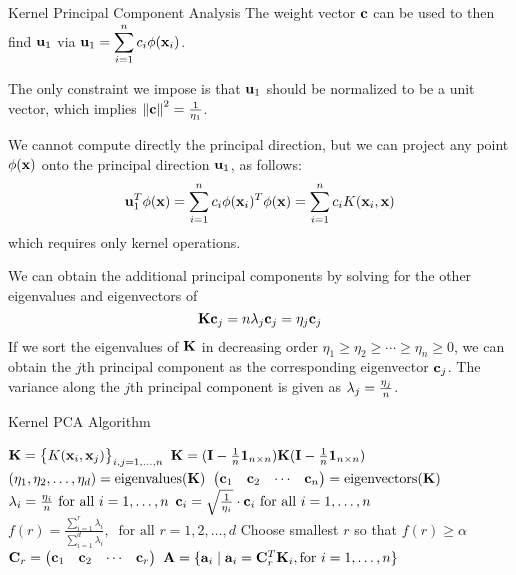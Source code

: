 \begin{frame}{Kernel Principal Component Analysis}
  \small
  The weight vector $\mathbf{c}$ can be used to then find $\mathbf{u}_1$ via
$\mathbf{u}_1 = \displaystyle \sum_{i=1}^n c_{i} \phi(\mathbf{x}_i)$.

\medskip
The only constraint we impose is that $\mathbf{u}_1$
should be
normalized to be a unit vector, which implies
  $\left\lVert\mathbf{c}\right\rVert^2 = {1 \over \eta_1}$.


\medskip
We cannot compute directly the
principal direction, but we can
project any point $\phi(\mathbf{x})$ onto the principal
direction $\mathbf{u}_1$, as follows:
\begin{align*}
  \mathbf{u}_1^T\phi(\mathbf{x}) = \displaystyle \sum_{i=1}^n c_i\phi(\mathbf{x}_i)^T\phi(\mathbf{x}) =
  \displaystyle \sum_{i=1}^n c_i K(\mathbf{x}_i,\mathbf{x})
\end{align*}
which requires only kernel operations. 

\medskip
We can obtain the additional principal
components by solving for the other eigenvalues and eigenvectors of
$$\mathbf{K}\mathbf{c}_j = n \lambda_j \mathbf{c}_j = \eta_j \mathbf{c}_j$$
If we sort the
eigenvalues of $\mathbf{K}$ in decreasing order
$\eta_1 \ge \eta_2 \ge \cdots
\ge \eta_n \ge 0$, we can obtain the $j$th principal component as
the corresponding eigenvector $\mathbf{c}_{j}$.
The variance
along the $j$th principal component is given as 
$\lambda_{j} = {\eta_{j} \over n}$. 
\end{frame}


\begin{frame}{Kernel PCA Algorithm}
  \begin{algorithm}[H]
\newcommand{\KPCA}{\textsc{KernelPCA}}
\SetKwInOut{Algorithm}{\KPCA\ ($\bD, K, \alpha$)}
\Algorithm{}
$\mathbf{K} = \bigl\{K(\mathbf{x}_i, \mathbf{x}_{j}) \bigr\}_{i,j=1,\ldots,n}$ 
$\mathbf{K}  = (\mathbf{I} - {1\over n}\mathbf{1}_{n\times n}) \mathbf{K} (\mathbf{I} - {1\over
n}\mathbf{1}_{n \times n})$ 
$(\eta_1, \eta_2, \ldots, \eta_d) =
\text{eigenvalues}(\mathbf{K})$ 
$\begin{pmatrix} \mathbf{c}_1 & \mathbf{c}_2 & \cdots & \mathbf{c}_n \end{pmatrix} =
\text{eigenvectors}(\mathbf{K})$ 
$\lambda_i = {\eta_i \over n} \text{ for all } i = 1, \ldots,
n$ 
$\mathbf{c}_i = \sqrt{1 \over \eta_i} \cdot \mathbf{c}_i \text{ for all } i =
1, \ldots, n$ 
$f(r) = \frac{\sum_{i=1}^r \lambda_i}{\sum_{i=1}^d \lambda_i},
\;\; \text{for all } r=1, 2, \ldots, d$ 
Choose smallest $r$ so that $f(r) \ge \alpha$ 
$\mathbf{C}_r = \begin{pmatrix} \mathbf{c}_1 & \mathbf{c}_2 & \cdots & \mathbf{c}_r \end{pmatrix}$ 
$\mathbf{A} = \{\mathbf{a}_i \mid \mathbf{a}_i = \mathbf{C}_r^T\mathbf{K}_i, \text{for } i=1, \ldots,
n\}$ 
\end{algorithm}
\end{frame}


